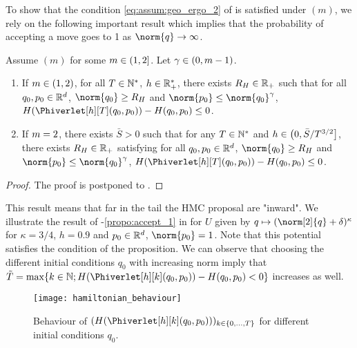 To show that the condition \eqref{eq:assum:geo_ergo_2} of
 is satisfied under
$(m)$, we rely on the following important result which implies that the probability of accepting a move goes to 1 as $\norm{q} \to \infty$.
\begin{proposition}
  \label{propo:accept} Assume
  $(m)$ for some $m \in \left(1,2\right]$. Let $\gamma \in \left(0,m-1\right)$.
  \begin{enumerate}[label=(\alph*)]
  \item
  \label{propo:accept_1}
  If $m\in (1,2)$, for all $T \in \mathbb{N}^{*}$, $h \in \mathbb{R}_+^*$, there exists $R_{H} \in \mathbb{R}_+$ such that for
  all $q_0,p_0 \in \mathbb{R}^d$, $\norm{q_0} \geq R_{\Ham}$ and
  $\norm{p_0} \leq \norm{\q_0}^{\gamma}$, $ \Ham(\Phiverlet[h][T](q_0,p_0)) -
  \Ham(q_0,p_0) \leq 0$.
\item
  \label{propo:accept_2}
  If $m=2$,   there exists $\bar{S} >0$ such that for any $T \in \mathbb{N}^{*}$ and $h \in \left(0, \bar{S}/T^{3/2}\right]$,  there exists $R_{H} \in \mathbb{R}_+$ satisfying for all $q_0,p_0 \in \mathbb{R}^d$, $\norm{q_0} \geq R_{\Ham}$ and
  $\norm{p_0} \leq \norm{\q_0}^{\gamma}$, $ \Ham(\Phiverlet[h][T](q_0,p_0)) -
  \Ham(q_0,p_0) \leq 0$.
  \end{enumerate}
\end{proposition}


\begin{proof}
  The proof is postponed to  .
\end{proof}


This result  means that far in the tail the HMC proposal are "inward".
We illustrate the result of -\ref{propo:accept_1}
in  for $U$ given by $\q \mapsto
(\norm[2]{\q}+\delta)^{\kappa}$ for $\kappa=3/4$, $h = 0.9$ and
$p_0 \in \mathbb{R}^d$, $\norm{p_0}=1$. Note that this potential satisfies
the condition of the proposition. We can observe that choosing the different
initial conditions $q_0$ with increasing norm imply that $\tilde{T} =
\max\{k \in \nset ; \Ham(\Phiverlet[h][k](q_0,p_0)) - \Ham(q_0,p_0)
<0\}$ increases as well.

 \begin{figure}[h]
   \centering
   \texttt{[image: hamiltonian\_behaviour]}
   \caption{Behaviour of $(\Ham(\Phiverlet[h][k](q_0,p_0)))_{k \in \{0,\ldots,T\}}$ for different initial conditions $q_0$.}
   \label{fig:H_behaviour}
 \end{figure}


